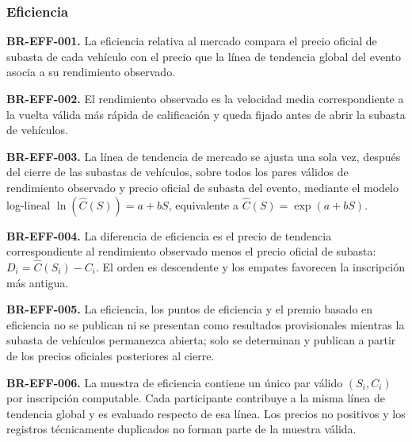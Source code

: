 \documentclass[10pt,letterpaper]{article}
\begin{document}
\subsubsection{Eficiencia}
\noindent\textbf{BR-EFF-001.} La eficiencia relativa al mercado compara el precio oficial de subasta de cada vehículo con el precio que la línea de tendencia global del evento asocia a su rendimiento observado.\par
\noindent\textbf{BR-EFF-002.} El rendimiento observado es la velocidad media correspondiente a la vuelta válida más rápida de calificación y queda fijado antes de abrir la subasta de vehículos.\par
\noindent\textbf{BR-EFF-003.} La línea de tendencia de mercado se ajusta una sola vez, después del cierre de las subastas de vehículos, sobre todos los pares válidos de rendimiento observado y precio oficial de subasta del evento, mediante el modelo log-lineal $\ln(\widehat{C}(S))=a+bS$, equivalente a $\widehat{C}(S)=\exp(a+bS)$.\par
\noindent\textbf{BR-EFF-004.} La diferencia de eficiencia es el precio de tendencia correspondiente al rendimiento observado menos el precio oficial de subasta: $D_i=\widehat{C}(S_i)-C_i$. El orden es descendente y los empates favorecen la inscripción más antigua.\par
\noindent\textbf{BR-EFF-005.} La eficiencia, los puntos de eficiencia y el premio basado en eficiencia no se publican ni se presentan como resultados provisionales mientras la subasta de vehículos permanezca abierta; solo se determinan y publican a partir de los precios oficiales posteriores al cierre.\par
\noindent\textbf{BR-EFF-006.} La muestra de eficiencia contiene un único par válido $(S_i,C_i)$ por inscripción computable. Cada participante contribuye a la misma línea de tendencia global y es evaluado respecto de esa línea. Los precios no positivos y los registros técnicamente duplicados no forman parte de la muestra válida.\par
\end{document}
